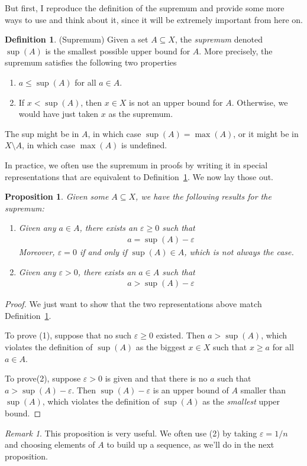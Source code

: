\documentclass[12pt]{article}
\theoremstyle{plain}
\newtheorem{prop}[thm]{Proposition}
\theoremstyle{definition}
\newtheorem{defn}[thm]{Definition}
\theoremstyle{remark}
\newtheorem*{rmk}{Remark}
\begin{document}
But first, I reproduce the definition of the supremum and provide some
more ways to use and think about it, since it will be extremely
important from here on.

\begin{defn}{(Supremum)}
\label{defn:supdef2}
Given a set $A\subseteq X$, the \emph{supremum} denoted $\sup(A)$ is the
smallest possible upper bound for $A$.
More precisely, the supremum satisfies the following two properties
\begin{enumerate}
  \item $a\leq \sup(A)$ for all $a\in A$.
  \item If $x<\sup(A)$, then $x\in X$ is not an upper bound for $A$.
    Otherwise, we would have just taken $x$ as the supremum.
\end{enumerate}
The sup might be in $A$, in which case $\sup(A) = \max(A)$, or it might
be in $X\setminus A$, in which case $\max(A)$ is undefined.
\end{defn}

In practice, we often use the supremum in proofs by writing it in
special representations that are equivalent to
Definition~\ref{defn:supdef2}. We now lay those out.
\begin{prop}
Given some $A\subseteq X$, we have the following results for the
supremum:
\begin{enumerate}
  \item Given any $a\in A$, there exists an $\varepsilon\geq 0$ such
    that
    \begin{align*}
      a = \sup(A) - \varepsilon
    \end{align*}
    Moreover, $\varepsilon=0$ if and only if $\sup(A) \in A$, which is
    not always the case.
  \item Given any $\varepsilon>0$, there exists an $a\in A$ such that
    \begin{align*}
      a > \sup(A) -\varepsilon
    \end{align*}
\end{enumerate}
\end{prop}
\begin{proof}
We just want to show that the two representations above match
Definition~\ref{defn:supdef2}.

To prove (1), suppose that no such $\varepsilon\geq 0$ existed. Then $a
> \sup(A)$, which violates the definition of $\sup(A)$ as the biggest
$x\in X$ such that $x\geq a$ for all $a\in A$.

To prove(2), suppose $\varepsilon>0$ is given and that there is no $a$
such that $a>\sup(A)-\varepsilon$. Then $\sup(A)-\varepsilon$ is an
upper bound of $A$ smaller than $\sup(A)$, which violates the definition
of $\sup(A)$ as the \emph{smallest} upper bound.
\end{proof}
\begin{rmk}
This proposition is very useful. We often use (2) by taking
$\varepsilon=1/n$ and choosing elements of $A$ to build up a sequence,
as we'll do in the next proposition.
\end{rmk}
\end{document}
